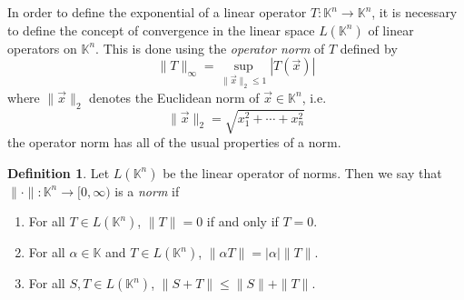 \documentclass[11pt]{book}
\theoremstyle{definition}\newtheorem{definition}[subsection]{Definition}
\theoremstyle{definition}\newtheorem{example}[subsection]{Example}
\theoremstyle{definition}\newtheorem{notation}[subsection]{Notation}
\theoremstyle{definition}\newtheorem{remark}[subsection]{Remark}
\theoremstyle{theorem}\newtheorem{theorem}[subsection]{Theorem}
\theoremstyle{theorem}\newtheorem{lemma}[subsection]{Lemma}
\theoremstyle{theorem}\newtheorem{proposition}[subsection]{Proposition}
\theoremstyle{theorem}\newtheorem{corollary}[subsection]{Corollary}
\theoremstyle{theorem}\newtheorem{case}{Case}
\theoremstyle{remark}\newtheorem{subcase}{Subcase}[case]
\newcommand{\K}{\mathbb{K}}
\begin{document}
In order to define the exponential of a linear operator $T : \K^n \to \K^n$, it is necessary to define the concept of convergence in the linear space $L(\K^n)$ of linear operators on $\K^n$. This is done using the \emph{operator norm} of $T$ defined by
\begin{equation*}
    \|T\|_{\infty} = \sup_{\|\vec{x}\|_2 \leq 1} |T(\vec{x})|
\end{equation*}
where $\|\vec{x}\|_2$ denotes the Euclidean norm of $\vec{x} \in \K^n$, i.e.
\begin{equation*}
    \|\vec{x}\|_2 = \sqrt{x_1^2 + \cdots + x_n^2}
\end{equation*}
the operator norm has all of the usual properties of a norm.

\begin{definition}\label{definition:1.3.1}
    Let $L(\K^n)$ be the linear operator of norms. Then we say that $\|\cdot\| : \K^n \to [0, \infty)$ is a \emph{norm} if
    \begin{enumerate}
        \item For all $T \in L(\K^n)$, $\|T\| = 0$ if and only if $T = 0$.
        \item For all $\alpha \in \K$ and $T \in L(\K^n)$, $\|\alpha T\| = |\alpha|\|T\|$.
        \item For all $S, T \in L(\K^n)$, $\|S + T\| \leq \|S\| + \|T\|$.
    \end{enumerate}
\end{definition}
\end{document}
